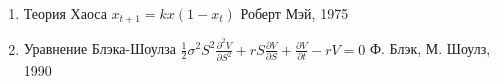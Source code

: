 \documentclass[12pt]{article}
\begin{document}
\begin{enumerate}
\item\begin{minipage}[t]{100mm} 
 Теория Хаоса                                           $x_{t+1} = kx(1-x_t)$
\hfill Роберт Мэй, 1975 \end{minipage} 

\item\begin{minipage}[t]{100mm} 
 Уравнение Блэка-Шоулза                      $\frac 1{2}\sigma^2 S^2 \frac{\partial^2 V}{\partial S^2} + rS \frac{\partial V}{\partial S} + \frac{\partial V}{\partial t} - rV = 0$
\hfill Ф. Блэк, М. Шоулз, 1990 \end{minipage} 
\end{enumerate}
\end{document}
